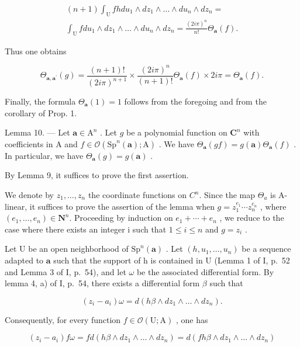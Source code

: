 \[
\begin{array}{c} (n + 1) \int_ {\mathrm{U}} f h d u _ {1} \wedge d z _ {1} \wedge \dots \wedge d u _ {n} \wedge d z _ {n} = \\ \int_ {\mathrm{U}} f   d u _ {1} \wedge d z _ {1} \wedge \dots \wedge d u _ {n} \wedge d z _ {n} = \frac {(2 i \pi) ^ {n}}{n !} \Theta_ {\boldsymbol {a}} (f). \end{array}
\]

Thus one obtains

\[
\Theta_ {\boldsymbol {a}, \boldsymbol {a} ^ {\prime}} (g) = \frac {(n + 1) !}{(2 i \pi) ^ {n + 1}} \times \frac {(2 i \pi) ^ {n}}{(n + 1) !} \Theta_ {\boldsymbol {a}} (f) \times 2 i \pi = \Theta_ {\boldsymbol {a}} (f).
\]

Finally, the formula \(\Theta_{\boldsymbol{a}}(1)=1\) follows from the foregoing and from the corollary of Prop. 1.

Lemma 10. --- Let \(\boldsymbol{a} \in \mathrm{A}^n\) . Let \(g\) be a polynomial function on \(\mathbf{C}^n\) with coefficients in A and \(f \in \mathcal{O}(\mathrm{Sp}^n(\boldsymbol{a});\mathrm{A})\) . We have \(\Theta_{\boldsymbol{a}}(gf) = g(\boldsymbol{a})\Theta_{\boldsymbol{a}}(f)\) . In particular, we have \(\Theta_{\boldsymbol{a}}(g) = g(\boldsymbol{a})\) .

By Lemma 9, it suffices to prove the first assertion.

We denote by \(z_{1},\ldots,z_{n}\) the coordinate functions on \(C^{n}\). Since the map \(\Theta_{a}\) is A-linear, it suffices to prove the assertion of the lemma when \(g=z_{1}^{e_{1}}\cdots z_{n}^{e_{n}}\) , where \((e_{1},\ldots,e_{n})\in\mathbf{N}^{n}\). Proceeding by induction on \(e_{1}+\cdots+e_{n}\) , we reduce to the case where there exists an integer i such that \(1\leqslant i\leqslant n\) and \(g=z_{i}\) .

Let U be an open neighborhood of \(\mathrm{Sp}^{n}(\boldsymbol{a})\) . Let \((h,u_{1},\ldots,u_{n})\) be a sequence adapted to \(\boldsymbol{a}\) such that the support of h is contained in U (Lemma 1 of I, p.~52 and Lemma 3 of I, p.~54), and let \(\omega\) be the associated differential form. By lemma 4, a) of I, p.~54, there exists a differential form \(\beta\) such that

\[
(z _ {i} - a _ {i}) \omega = d (h \beta \wedge d z _ {1} \wedge \dots \wedge d z _ {n}).
\]

Consequently, for every function \(f \in \mathcal{O}(\mathrm{U};\mathrm{A})\) , one has

\[
\left(z _ {i} - a _ {i}\right) f \omega = f d \left(h \beta \wedge d z _ {1} \wedge \dots \wedge d z _ {n}\right) = d \left(f h \beta \wedge d z _ {1} \wedge \dots \wedge d z _ {n}\right)
\]

